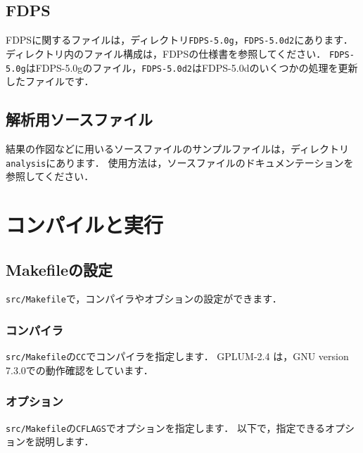 \documentclass[12pt,a4paper,dvipdfmx]{jsarticle}
\newcommand{\ourcodeR}{GPLUM-2.4\xspace}
\begin{document}
\subsection{FDPS}
FDPSに関するファイルは，ディレクトリ\texttt{FDPS-5.0g}，\texttt{FDPS-5.0d2}にあります．
ディレクトリ内のファイル構成は，FDPSの仕様書を参照してください．
\texttt{FDPS-5.0g}はFDPS-5.0gのファイル，\texttt{FDPS-5.0d2}はFDPS-5.0dのいくつかの処理を更新したファイルです．

\subsection{解析用ソースファイル}
結果の作図などに用いるソースファイルのサンプルファイルは，ディレクトリ\texttt{analysis}にあります．
使用方法は，ソースファイルのドキュメンテーションを参照してください．



\section{コンパイルと実行}

\subsection{Makefileの設定}

\texttt{src/Makefile}で，コンパイラやオブションの設定ができます．

\subsubsection{コンパイラ}
\texttt{src/Makefile}の\texttt{CC}でコンパイラを指定します．
\ourcodeR は，GNU version 7.3.0での動作確認をしています．

\subsubsection{オプション}
\texttt{src/Makefile}の\texttt{CFLAGS}でオプションを指定します．
以下で，指定できるオプションを説明します．
\end{document}
